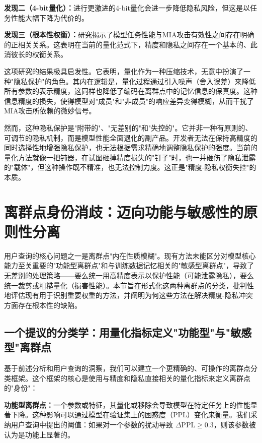 \documentclass[letterpaper,twocolumn,10pt]{article}
\begin{document}
\textbf{发现二（4-bit量化）：}进行更激进的4-bit量化会进一步降低隐私风险，但这是以任务性能大幅下降为代价的。

\textbf{发现三（根本性权衡）：}研究揭示了模型任务性能与MIA攻击有效性之间存在明确的正相关关系。这表明在当前的量化范式下，精度和隐私之间存在一个基本的、此消彼长的权衡关系。

这项研究的结果极具启发性。它表明，量化作为一种压缩技术，无意中扮演了一种"隐私保护"的角色。其内在逻辑是，量化过程通过引入噪声（舍入误差）来降低所有参数的表示精度，这同样也降低了编码在离群点中的记忆信息的保真度。这种信息精度的损失，使得模型对"成员"和"非成员"的响应差异变得模糊，从而干扰了MIA攻击所依赖的微妙信号。

然而，这种隐私保护是"附带的"、"无差别的"和"失控的"。它并非一种有原则的、可调节的隐私机制，而是模型性能全面退化的副产品。开发者无法在保持高精度的同时选择性地增强隐私保护，也无法根据需求精确地调整隐私保护的强度。当前的量化方法就像一把钝器，在试图砸掉精度损失的"钉子"时，也一并砸伤了隐私泄露的"载体"，但这种操作既不精准，也无法控制力度。这正是"精度-隐私权衡失控"的本质。

\section{离群点身份消歧：迈向功能与敏感性的原则性分离}

用户查询的核心问题之一是离群点"内在性质模糊"。现有方法未能区分对模型核心能力至关重要的"功能型离群点"和与训练数据记忆相关的"敏感型离群点"，导致了无差别的处理策略——要么统一用高精度表示以保护性能（可能泄露隐私），要么统一裁剪或粗糙量化（损害性能）。本节旨在形式化这两种离群点的分类，批判性地评估现有用于识别重要权重的方法，并阐明为何这些方法在解决精度-隐私冲突方面存在根本性的缺陷。

\subsection{一个提议的分类学：用量化指标定义"功能型"与"敏感型"离群点}

基于前述分析和用户查询的洞察，我们可以建立一个更精确的、可操作的离群点分类框架。这个框架的核心是使用与精度和隐私直接相关的量化指标来定义离群点的"身份"：

\textbf{功能型离群点：}一个参数或特征，其量化或移除会导致模型在特定任务上的性能显著下降。这种影响可以通过模型在验证集上的困惑度（PPL）变化来衡量。我们采纳用户查询中提出的阈值：如果对一个参数的扰动导致 $\Delta \text{PPL} \geq 0.3$，则该参数被认为是功能上显著的。
\end{document}
